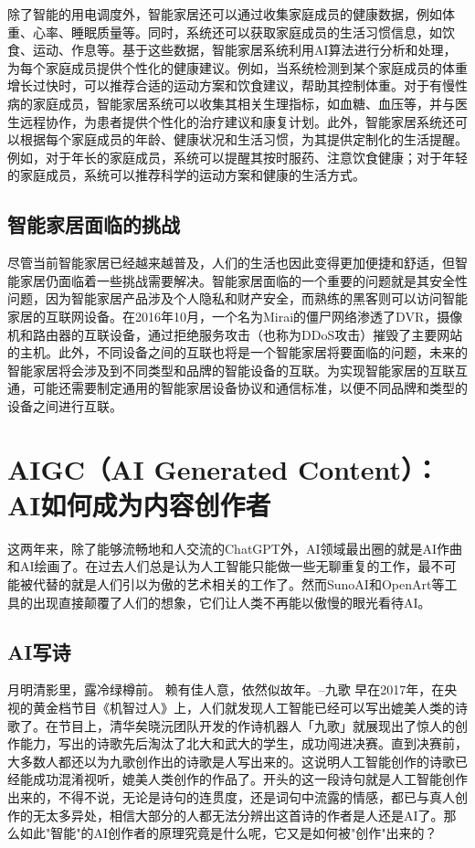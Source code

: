 除了智能的用电调度外，智能家居还可以通过收集家庭成员的健康数据，例如体重、心率、睡眠质量等。同时，系统还可以获取家庭成员的生活习惯信息，如饮食、运动、作息等。基于这些数据，智能家居系统利用AI算法进行分析和处理，为每个家庭成员提供个性化的健康建议。例如，当系统检测到某个家庭成员的体重增长过快时，可以推荐合适的运动方案和饮食建议，帮助其控制体重。对于有慢性病的家庭成员，智能家居系统可以收集其相关生理指标，如血糖、血压等，并与医生远程协作，为患者提供个性化的治疗建议和康复计划。此外，智能家居系统还可以根据每个家庭成员的年龄、健康状况和生活习惯，为其提供定制化的生活提醒。例如，对于年长的家庭成员，系统可以提醒其按时服药、注意饮食健康；对于年轻的家庭成员，系统可以推荐科学的运动方案和健康的生活方式。

\subsection{智能家居面临的挑战}
尽管当前智能家居已经越来越普及，人们的生活也因此变得更加便捷和舒适，但智能家居仍面临着一些挑战需要解决。智能家居面临的一个重要的问题就是其安全性问题，因为智能家居产品涉及个人隐私和财产安全，而熟练的黑客则可以访问智能家居的互联网设备。在2016年10月，一个名为Mirai的僵尸网络渗透了DVR，摄像机和路由器的互联设备，通过拒绝服务攻击（也称为DDoS攻击）摧毁了主要网站的主机。此外，不同设备之间的互联也将是一个智能家居将要面临的问题，未来的智能家居将会涉及到不同类型和品牌的智能设备的互联。为实现智能家居的互联互通，可能还需要制定通用的智能家居设备协议和通信标准，以便不同品牌和类型的设备之间进行互联。

\section[AIGC]{AIGC（AI Generated Content）：AI如何成为内容创作者}
这两年来，除了能够流畅地和人交流的ChatGPT外，AI领域最出圈的就是AI作曲和AI绘画了。在过去人们总是认为人工智能只能做一些无聊重复的工作，最不可能被代替的就是人们引以为傲的艺术相关的工作了。然而SunoAI和OpenArt等工具的出现直接颠覆了人们的想象，它们让人类不再能以傲慢的眼光看待AI。

\subsection{AI写诗}
月明清影里，露冷绿樽前。
赖有佳人意，依然似故年。--九歌
早在2017年，在央视的黄金档节目《机智过人》上，人们就发现人工智能已经可以写出媲美人类的诗歌了。在节目上，清华矣晓沅团队开发的作诗机器人「九歌」就展现出了惊人的创作能力，写出的诗歌先后淘汰了北大和武大的学生，成功闯进决赛。直到决赛前，大多数人都还以为九歌创作出的诗歌是人写出来的。这说明人工智能创作的诗歌已经能成功混淆视听，媲美人类创作的作品了。开头的这一段诗句就是人工智能创作出来的，不得不说，无论是诗句的连贯度，还是词句中流露的情感，都已与真人创作的无太多异处，相信大部分的人都无法分辨出这首诗的作者是人还是AI了。那么如此"智能"的AI创作者的原理究竟是什么呢，它又是如何被"创作"出来的？

